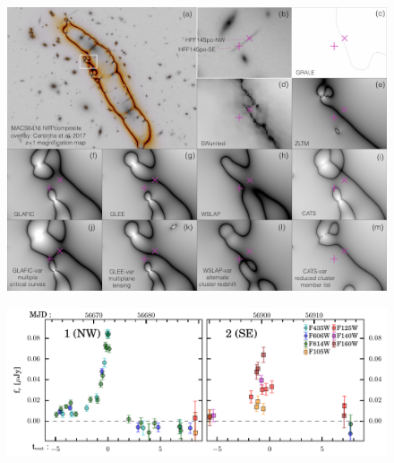\begin{figure}[tbp]
  \begin{center}
    \includegraphics[width=\textwidth]{spock_critical_curves.png}
    \caption{\protect}
  \end{center}
\end{figure}

\begin{figure}[tbp]
\begin{center}
\includegraphics[width=1\textwidth]{spock_lightcurves_flux.pdf}
\caption{ \protect}
\end{center}
\end{figure}


